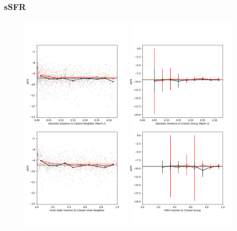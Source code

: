 \subsubsection{sSFR}

\begin{figure}
    \includegraphics[width=0.49\textwidth]{Images/smallScaleEnvironment/dwarf_sSFR_300}
    \includegraphics[width=0.49\textwidth]{Images/smallScaleEnvironment/dwarf_sSFR_300_group}

\end{figure}

